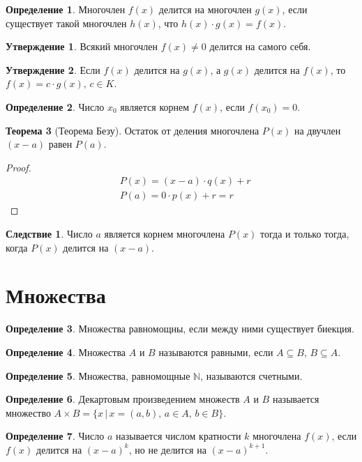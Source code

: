 \documentclass[12pt]{article}
\theoremstyle{definition}
\newtheorem{theorem}{Теорема}[section]
\newtheorem{definition}{Определение}
\newtheorem{statement}[theorem]{Утверждение}
\newtheorem{consequence}{Следствие}[subsection]
\newcommand{\N}{\mathbb{N}}
\begin{document}
\begin{definition}
    Многочлен $f(x)$ делится на многочлен $g(x)$, если существует такой многочлен $h(x)$, что $h(x)\cdot g(x)=f(x)$.
\end{definition}
\begin{statement}
    Всякий многочлен $f(x)\neq0$ делится на самого себя.
\end{statement}
\begin{statement}
    Если $f(x)$ делится на $g(x)$, а $g(x)$ делится на $f(x)$, то $f(x)=c\cdot g(x),\,c\in K$.
\end{statement}
\begin{definition}
    Число $x_0$ является корнем $f(x)$, если $f(x_0)=0$.
\end{definition}
\begin{theorem}[Теорема Безу]
    Остаток от деления многочлена $P(x)$ на двучлен $(x-a)$ равен $P(a)$.
\end{theorem}
\begin{proof}
    \begin{align*}
    &P(x)=(x-a)\cdot q(x)+r\\
    &P(a)=0\cdot p(x)+r=r
\end{align*}
\end{proof}
\setcounter{subsection}{4}
\begin{consequence}
    Число $a$ является корнем многочлена $P(x)$ тогда и только тогда, когда $P(x)$ делится на $(x-a)$.
\end{consequence}

\section{Множества}
\begin{definition}
    Множества равномощны, если между ними существует биекция.
\end{definition}
\begin{definition}
    Множества $A$ и $B$ называются равными, если $A\subseteq B,\,B\subseteq A.$
\end{definition}
\begin{definition}
    Множества, равномощные $\N$, называются счетными.
\end{definition}
\begin{definition}
    Декартовым произведением множеств $A$ и $B$ называется множество $A\times B=\{x\,|\,x=(a,b),\,a\in A,\,b\in B\}$.
\end{definition}
\begin{definition}
    Число $a$ называется числом кратности $k$ многочлена $f(x)$, если $f(x)$ делится на $(x-a)^k$, но не делится на $(x-a)^{k+1}$.
\end{definition}
\end{document}
